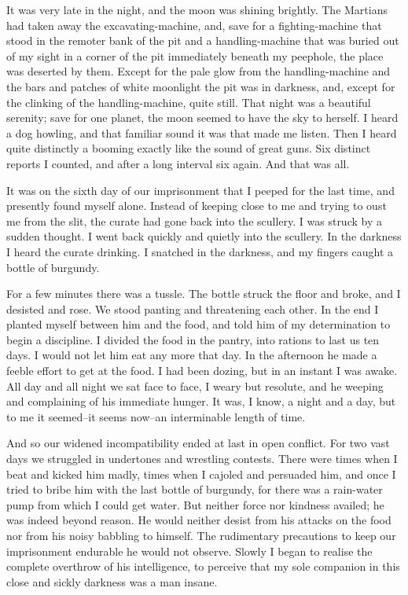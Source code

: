 It was very late in the night, and the moon was shining brightly.
The Martians had taken away the excavating-machine, and, save for a
fighting-machine that stood in the remoter bank of the pit and a
handling-machine that was buried out of my sight in a corner of the
pit immediately beneath my peephole, the place was deserted by
them. Except for the pale glow from the handling-machine and the
bars and patches of white moonlight the pit was in darkness, and,
except for the clinking of the handling-machine, quite still. That
night was a beautiful serenity; save for one planet, the moon
seemed to have the sky to herself. I heard a dog howling, and that
familiar sound it was that made me listen. Then I heard quite
distinctly a booming exactly like the sound of great guns. Six
distinct reports I counted, and after a long interval six again.
And that was all.

It was on the sixth day of our imprisonment that I peeped for the
last time, and presently found myself alone. Instead of keeping
close to me and trying to oust me from the slit, the curate had
gone back into the scullery. I was struck by a sudden thought. I
went back quickly and quietly into the scullery. In the darkness I
heard the curate drinking. I snatched in the darkness, and my
fingers caught a bottle of burgundy.

For a few minutes there was a tussle. The bottle struck the floor
and broke, and I desisted and rose. We stood panting and
threatening each other. In the end I planted myself between him and
the food, and told him of my determination to begin a discipline. I
divided the food in the pantry, into rations to last us ten days. I
would not let him eat any more that day. In the afternoon he made a
feeble effort to get at the food. I had been dozing, but in an
instant I was awake. All day and all night we sat face to face, I
weary but resolute, and he weeping and complaining of his immediate
hunger. It was, I know, a night and a day, but to me it seemed--it
seems now--an interminable length of time.

And so our widened incompatibility ended at last in open conflict.
For two vast days we struggled in undertones and wrestling
contests. There were times when I beat and kicked him madly, times
when I cajoled and persuaded him, and once I tried to bribe him
with the last bottle of burgundy, for there was a rain-water pump
from which I could get water. But neither force nor kindness
availed; he was indeed beyond reason. He would neither desist from
his attacks on the food nor from his noisy babbling to himself. The
rudimentary precautions to keep our imprisonment endurable he would
not observe. Slowly I began to realise the complete overthrow of
his intelligence, to perceive that my sole companion in this close
and sickly darkness was a man insane.

